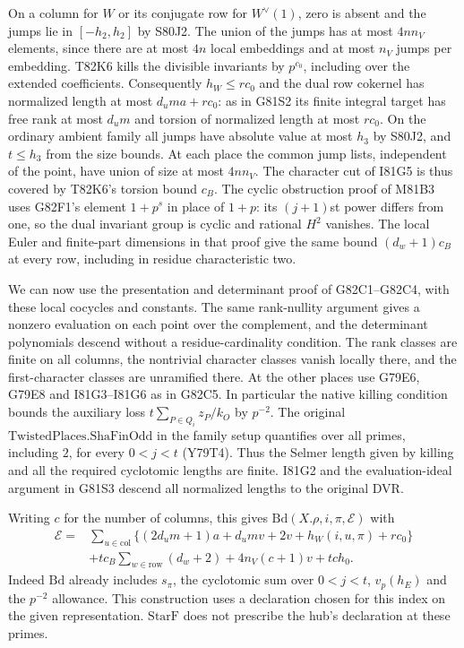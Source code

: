 On a column for $W$ or its conjugate row for $W^\vee(1)$,
zero is absent and the jumps lie in $[-h_2,h_2]$ by S80J2.
The union of the jumps has at most $4n n_V$ elements, since
there are at most $4n$ local embeddings and at most $n_V$
jumps per embedding. T82K6 kills the divisible invariants by
$p^{c_0}$, including over the extended coefficients.
Consequently $h_W\le r c_0$ and the dual row cokernel has
normalized length at most $d_um a+r c_0$: as in G81S2 its
finite integral target has free rank at most $d_um$ and torsion
of normalized length at most $r c_0$. On the ordinary ambient
family all jumps have absolute value at most $h_3$ by S80J2,
and $t\le h_3$ from the size bounds. At each place the common
jump lists, independent of the point, have union of size at most
$4n n_V$. The character cut of I81G5 is thus covered by
T82K6's torsion bound $c_B$. The cyclic obstruction proof
of M81B3 uses G82F1's element $1+p^s$ in place of $1+p$:
its $(j+1)$st power differs from one, so the dual invariant
group is cyclic and rational $H^2$ vanishes. The local Euler and
finite-part dimensions in that proof give the same bound
$(d_w+1)c_B$ at every row, including in residue characteristic two.

We can now use the presentation and determinant proof of
G82C1--G82C4, with these local cocycles and constants. The same
rank-nullity argument gives a nonzero evaluation on each point
over the complement, and the determinant polynomials descend
without a residue-cardinality condition. The rank classes are
finite on all columns, the nontrivial character classes vanish
locally there, and the first-character classes are unramified
there. At the other places use G79E6, G79E8 and I81G3--I81G6
as in G82C5. In particular the native killing condition bounds
the auxiliary loss $t\sum_{P\in Q_i}z_P/k_O$ by $p^{-2}$.
The original $\mathrm{TwistedPlaces.ShaFinOdd}$ in the family
setup quantifies over all primes, including $2$, for every
$0<j<t$ (Y79T4). Thus the Selmer length given by killing and
all the required cyclotomic lengths are finite. I81G2 and the
evaluation-ideal argument in G81S3 descend all normalized lengths
to the original DVR.

Writing $c$ for the number of columns, this gives
$\mathrm{Bd}(X.\rho,i,\pi,\mathcal E)$ with
\[
 \begin{aligned}
 \mathcal E={}&
   \sum_{u\in\mathrm{col}}\{(2d_um+1)a+d_um v+2v+h_W(i,u,\pi)+r c_0\}\\
   &+t c_B\sum_{w\in\mathrm{row}}(d_w+2)
                         +4 n_V(c+1)v+tc h_0 .
 \end{aligned}
\]
Indeed $\mathrm{Bd}$ already includes $s_\pi$, the cyclotomic
sum over $0<j<t$, $v_p(h_E)$ and the $p^{-2}$ allowance.
This construction uses a declaration chosen for this index on
the given representation. $\mathrm{StarF}$ does not prescribe
the hub's declaration at these primes.

